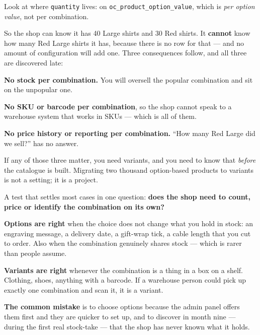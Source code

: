 \begin{alertbox}
Look at where \texttt{quantity} lives: on
\texttt{oc\_product\_option\_value}, which is \emph{per option value}, not per
combination.

\smallskip
So the shop can know it has 40 Large shirts and 30 Red shirts. It
\textbf{cannot} know how many Red Large shirts it has, because there is no row
for that --- and no amount of configuration will add one. Three consequences
follow, and all three are discovered late:

\begin{tight}
  \item \textbf{No stock per combination.} You will oversell the popular
        combination and sit on the unpopular one.
  \item \textbf{No SKU or barcode per combination}, so the shop cannot speak
        to a warehouse system that works in SKUs --- which is all of them.
  \item \textbf{No price history or reporting per combination.} ``How many
        Red Large did we sell?'' has no answer.
\end{tight}

\smallskip
If any of those three matter, you need variants, and you need to know that
\emph{before} the catalogue is built. Migrating two thousand option-based
products to variants is not a setting; it is a project.
\end{alertbox}

\begin{conceptbox}
A test that settles most cases in one question: \textbf{does the shop need to
count, price or identify the combination on its own?}

\smallskip
\textbf{Options are right} when the choice does not change what you hold in
stock: an engraving message, a delivery date, a gift-wrap tick, a cable length
that you cut to order. Also when the combination genuinely shares stock ---
which is rarer than people assume.

\smallskip
\textbf{Variants are right} whenever the combination is a thing in a box on a
shelf. Clothing, shoes, anything with a barcode. If a warehouse person could
pick up exactly one combination and scan it, it is a variant.

\smallskip
\textbf{The common mistake} is to choose options because the admin panel
offers them first and they are quicker to set up, and to discover in month
nine --- during the first real stock-take --- that the shop has never known
what it holds.
\end{conceptbox}

